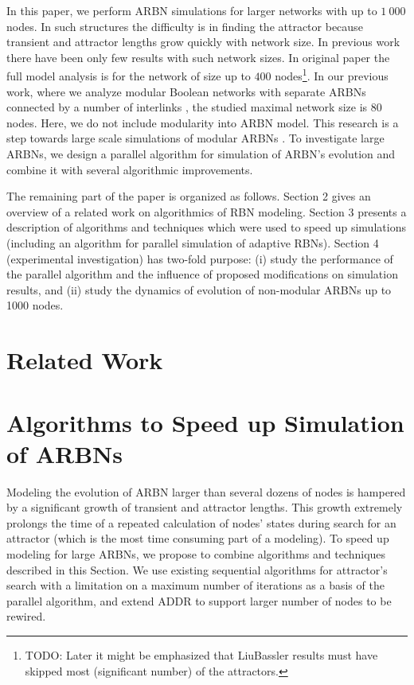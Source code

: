 \documentclass[procedia]{easychair}
\begin{document}
	In this paper, we perform ARBN simulations for larger networks with up to $1~000$ nodes. 
	In such structures the difficulty is in finding the attractor because transient and attractor lengths grow quickly with network size. 
	In previous work there have been only few results with such network sizes. In original paper \cite{mlb} the full model analysis is for the network of size up to $400$ nodes\footnote{TODO: Later it might be emphasized that LiuBassler results must have skipped most (significant number) of the attractors.}. 
	In our previous work, where we analyze modular Boolean networks with separate ARBNs connected by a number of interlinks \cite{Gorski2016}, the studied maximal network size is $80$ nodes. 
	Here, we do not include modularity into ARBN model. 
	This research is a step towards large scale simulations of modular ARBNs \cite{Gorski2016}. To investigate large ARBNs, we design a parallel algorithm for simulation of ARBN's evolution and combine it with several algorithmic improvements.
	
	The remaining part of the paper is organized as follows. Section 2 gives an overview of a related work on algorithmics of RBN modeling. Section 3 presents a description of algorithms and techniques which were used to speed up simulations (including an algorithm for parallel simulation of adaptive RBNs). Section 4 (experimental investigation) has two-fold purpose: (i) study the performance of the parallel algorithm and the influence of proposed modifications on simulation results, and (ii) study the dynamics of evolution of non-modular ARBNs up to 1000 nodes.

	\section{Related Work}
	\label{sect:related-work}

	\section{Algorithms to Speed up Simulation of ARBNs}
	\label{sect:algorithm}
	
	
	Modeling the evolution of ARBN larger than several dozens of nodes is hampered by a significant growth of transient and attractor lengths. This growth extremely prolongs the time of a repeated calculation of nodes' states during search for an attractor (which is the most time consuming part of a modeling). To speed up modeling for large ARBNs, we propose to combine algorithms and techniques described in this Section. We use existing sequential algorithms for attractor's search with a limitation on a maximum number of iterations as a basis of the parallel algorithm, and extend ADDR to support larger number of nodes to be rewired. 
	
\end{document}
